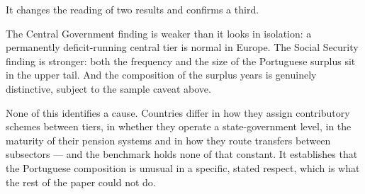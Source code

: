 It changes the reading of two results and confirms a third.

The Central Government finding is weaker than it looks in isolation: a permanently
deficit-running central tier is normal in Europe. The Social Security finding is
stronger: both the frequency and the size of the Portuguese surplus sit in the upper
tail. And the composition of the surplus years is genuinely distinctive, subject to the
sample caveat above.

None of this identifies a cause. Countries differ in how they assign contributory
schemes between tiers, in whether they operate a state-government level, in the maturity
of their pension systems and in how they route transfers between subsectors --- and the
benchmark holds none of that constant. It establishes that the Portuguese composition is
unusual in a specific, stated respect, which is what the rest of the paper could not do.
